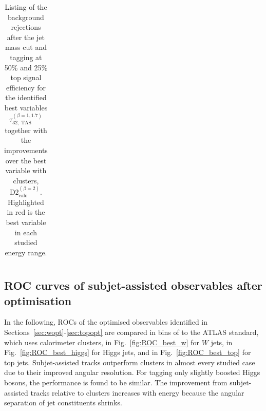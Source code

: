 \begin{table}
\begin{tabular}{llll}
\end{tabular}
\caption{Listing of the background rejections after the jet mass cut and tagging at 50\% and 25\% top signal efficiency for the identified best variables $\tau_{32,\;\text{TAS}}^{(\beta=1,1.7)}$ together with the improvements over the best variable with clusters, $\text{D2}_{\text{calo}}^{(\beta=2)}$. Highlighted in red is the best variable in each studied energy range.}\label{table:top_improvement}
\end{table}


\subsection{ROC curves of subjet-assisted observables after optimisation}\label{subsec:best_ROC}
In the following, ROCs of the optimised observables identified in Sections~\ref{sec:wopt}-\ref{sec:topopt} are compared in bins of \pt to the ATLAS standard, which uses calorimeter clusters, in Fig.~\ref{fig:ROC_best_w} for $W$ jets, in Fig.~\ref{fig:ROC_best_higgs} for Higgs jets, and in Fig.~\ref{fig:ROC_best_top} for top jets. Subjet-assisted tracks outperform clusters in almost every studied case due to their improved angular resolution. For tagging only slightly boosted Higgs bosons, the performance is found to be similar. The improvement from subjet-assisted tracks relative to clusters increases with energy because the angular separation of jet constituents shrinks.

